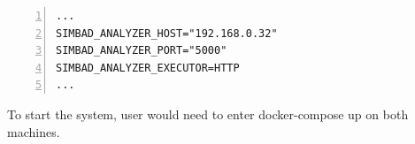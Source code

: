 \begin{lstlisting}[label=list:docker-split-env,caption=prod-docker-compose.yaml file, basicstyle=\footnotesize\ttfamily, numbers=left, escapechar=|]
...
SIMBAD_ANALYZER_HOST="192.168.0.32"
SIMBAD_ANALYZER_PORT="5000"
SIMBAD_ANALYZER_EXECUTOR=HTTP
...
\end{lstlisting}
To start the system, user would need to enter docker-compose up on both machines.
\label{sec:configuration}